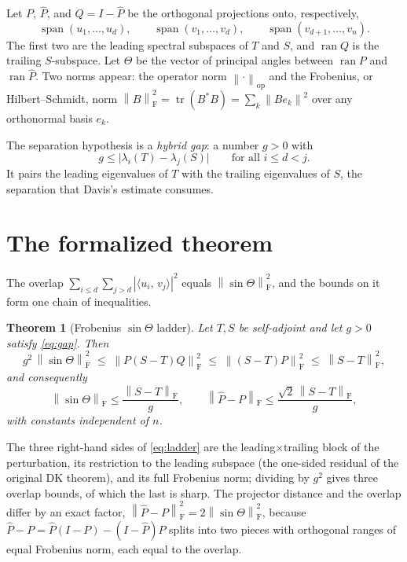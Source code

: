 \documentclass[11pt]{article}
\newcommand{\norm}[1]{\left\lVert #1\right\rVert}
\newcommand{\F}{\mathrm{F}}
\newcommand{\op}{\mathrm{op}}
\newcommand{\inner}[2]{\langle #1,\,#2\rangle}
\newcommand{\gap}{g}
\newcommand{\sinT}{\sin\Theta}
\DeclareMathOperator{\tr}{tr}
\DeclareMathOperator{\ran}{ran}
\DeclareMathOperator{\spann}{span}
\newtheorem{theorem}{Theorem}
\theoremstyle{remark}
\begin{document}
Let $P$, $\widehat P$, and $Q=I-\widehat P$ be the orthogonal projections onto,
respectively,
\[
  \spann(u_1,\dots,u_d),\qquad
  \spann(v_1,\dots,v_d),\qquad
  \spann(v_{d+1},\dots,v_n).
\]
The first two are the leading spectral subspaces of $T$ and $S$, and $\ran Q$ is
the trailing $S$-subspace.  Let $\Theta$ be the vector of principal angles between
$\ran P$ and $\ran\widehat P$.  Two norms appear: the operator norm
$\norm{\cdot}_{\op}$ and the Frobenius, or Hilbert--Schmidt, norm
$\norm{B}_{\F}^2=\tr(B^*B)=\sum_k\norm{Be_k}^2$ over any orthonormal basis $e_k$.

The separation hypothesis is a \emph{hybrid gap}: a number $\gap>0$ with
\begin{equation}\label{eq:gap}
  \gap\le\bigl|\lambda_i(T)-\lambda_j(S)\bigr|
  \qquad\text{for all }i\le d<j.
\end{equation}
It pairs the leading eigenvalues of $T$ with the trailing eigenvalues of $S$, the
separation that Davis's estimate consumes.

\section{The formalized theorem}

The overlap $\sum_{i\le d}\sum_{j>d}|\inner{u_i}{v_j}|^2$ equals
$\norm{\sinT}_{\F}^2$, and the bounds on it form one chain of inequalities.

\begin{theorem}[Frobenius $\sin\Theta$ ladder]\label{thm:ladder}
Let $T,S$ be self-adjoint and let $\gap>0$ satisfy \eqref{eq:gap}.  Then
\begin{equation}\label{eq:ladder}
  \gap^2\,\norm{\sinT}_{\F}^2
  \;\le\;\norm{P(S-T)Q}_{\F}^2
  \;\le\;\norm{(S-T)P}_{\F}^2
  \;\le\;\norm{S-T}_{\F}^2,
\end{equation}
and consequently
\[
  \norm{\sinT}_{\F}\le\frac{\norm{S-T}_{\F}}{\gap},
  \qquad
  \norm{\widehat P-P}_{\F}\le\frac{\sqrt2\,\norm{S-T}_{\F}}{\gap},
\]
with constants independent of $n$.
\end{theorem}

The three right-hand sides of \eqref{eq:ladder} are the leading$\times$trailing
block of the perturbation, its restriction to the leading subspace (the one-sided
residual of the original DK theorem), and its full Frobenius norm; dividing by
$\gap^2$ gives three overlap bounds, of which the last is sharp.  The projector
distance and the overlap differ by an exact factor,
$\norm{\widehat P-P}_{\F}^2=2\norm{\sinT}_{\F}^2$, because
$\widehat P-P=\widehat P(I-P)-(I-\widehat P)P$ splits into two pieces with
orthogonal ranges of equal Frobenius norm, each equal to the overlap.
\end{document}
